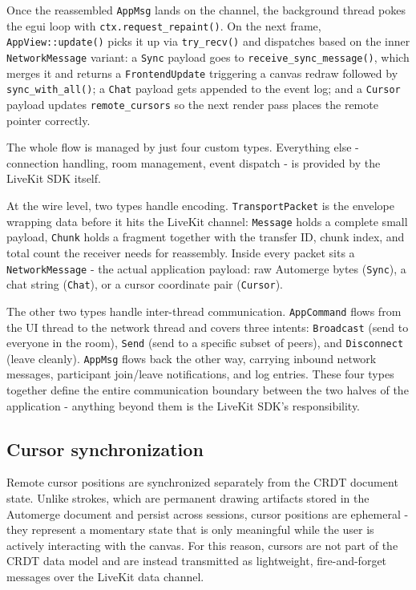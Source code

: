 \documentclass[a4paper,11pt,twoside]{report}
\theoremstyle{definition}
\begin{document}
Once the reassembled \texttt{AppMsg} lands on the channel, the background thread pokes the egui 
loop with \texttt{ctx.request\_repaint()}. On the next frame, \texttt{AppView::update()} picks it
 up via \texttt{try\_recv()} and dispatches based on the inner \texttt{NetworkMessage}
  variant: a \texttt{Sync} payload goes to \texttt{receive\_sync\_message()}, which merges 
  it and returns a \texttt{FrontendUpdate} triggering a canvas redraw
   followed by \texttt{sync\_with\_all()}; a \texttt{Chat} payload gets appended to the event log; 
   and a \texttt{Cursor} payload updates \texttt{remote\_cursors} so the next render pass places 
   the remote pointer correctly.

The whole flow is managed by just four custom types. Everything else - connection handling, 
room management, event dispatch - is provided by the LiveKit SDK itself.



At the wire level, two types handle encoding. \texttt{TransportPacket} is the envelope wrapping data
 before it hits the LiveKit channel: \texttt{Message} holds a complete small payload, \texttt{Chunk}
  holds a fragment together with the transfer ID, chunk index, and total count the receiver needs for 
  reassembly. Inside every packet sits a \texttt{NetworkMessage} - the actual application payload:
   raw Automerge bytes (\texttt{Sync}), a chat string (\texttt{Chat}), or a cursor coordinate
    pair (\texttt{Cursor}).

The other two types handle inter-thread communication. \texttt{AppCommand} flows from the UI thread 
to the network thread and covers three intents: \texttt{Broadcast} (send to everyone in the room),
 \texttt{Send} (send to a specific subset of peers), and \texttt{Disconnect} (leave cleanly). 
 \texttt{AppMsg} flows back the other way, carrying inbound network messages, participant join/leave 
 notifications, and log entries. These four types together define the entire communication boundary 
 between the two halves of the application - anything beyond them is the LiveKit SDK's responsibility.

\subsection{Cursor synchronization}

Remote cursor positions are synchronized separately from the CRDT document state. Unlike strokes,
 which are permanent drawing artifacts stored in the Automerge document and persist across sessions,
  cursor positions are ephemeral - they represent a momentary state that is only meaningful while the
   user is actively interacting with the canvas. For this reason, cursors are not part of the CRDT
    data model and are instead transmitted as lightweight, fire-and-forget messages over the LiveKit
	 data channel.
\end{document}
